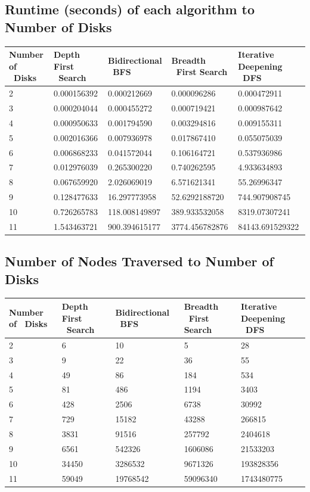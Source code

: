 \documentclass[conference]{IEEEtran}
\begin{document}
\begin{table}[t]
\subsection{Runtime (seconds) of each algorithm to Number of Disks}
\begin{tabular}{ |l |l |l |l |l |}
    \hline
    Number of \ Disks & Depth First \ Search & Bidirectional \ BFS & Breadth \ First Search & Iterative Deepening \ DFS \\ \hline
    2 & 0.000156392 & 0.000212669 & 0.000096286 & 0.000472911 \\ \hline
    3 & 0.000204044 & 0.000455272 & 0.000719421 & 0.000987642 \\ \hline
    4 & 0.000950633 & 0.001794590 & 0.003294816 & 0.009155311 \\ \hline
    5 & 0.002016366 & 0.007936978 & 0.017867410 & 0.055075039 \\ \hline
    6 & 0.006868233 & 0.041572044 & 0.106164721 & 0.537936986 \\ \hline
    7 & 0.012976039 & 0.265300220 & 0.740262595 & 4.933634893 \\ \hline
    8 & 0.067659920 & 2.026069019 & 6.571621341 & 55.26996347 \\ \hline
    9 & 0.128477633 & 16.297773958 & 52.6292188720 & 744.907908745 \\ \hline
    10 & 0.726265783 & 118.008149897 & 389.933532058 & 8319.07307241 \\ \hline
    11 & 1.543463721 & 900.394615177 & 3774.456782876 & 84143.691529322 \\ \hline
\end{tabular}
\end{table}

\subsection{Number of Nodes Traversed to Number of Disks}
\begin{tabular}{ | p{0.97cm} | p{1cm} | p{1.5cm} | p{2cm} | p{1.2cm} |}
    \hline
    Number of \ Disks & Depth First \ Search & Bidirectional \ BFS & Breadth \ First Search & Iterative Deepening \ DFS \\ \hline
2 & 6 & 10 & 5 & 28 \\ \hline
3 & 9 & 22 & 36 & 55 \\ \hline
4 & 49 & 86 & 184 & 534 \\ \hline
5 & 81 & 486 & 1194 & 3403 \\ \hline
6 & 428 & 2506 & 6738 & 30992 \\ \hline
7 & 729 & 15182 & 43288 & 266815 \\ \hline
8 & 3831 & 91516 & 257792 & 2404618 \\ \hline
9 & 6561 & 542326 & 1606086 & 21533203 \\ \hline
10 & 34450 & 3286532 & 9671326 & 193828356 \\ \hline
11 & 59049 & 19768542 & 59096340 & 1743480775 \\ \hline
\end{tabular}
\end{document}
